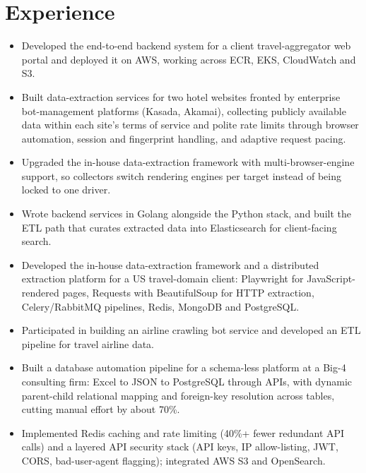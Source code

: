 \documentclass[10pt,a4paper]{article}
\begin{document}
\section{Experience}
\begin{itemize}
  \item Developed the end-to-end backend system for a client travel-aggregator web portal and deployed it on AWS, working across ECR, EKS, CloudWatch and S3.
  \item Built data-extraction services for two hotel websites fronted by enterprise bot-management platforms (Kasada, Akamai), collecting publicly available data within each site's terms of service and polite rate limits through browser automation, session and fingerprint handling, and adaptive request pacing.
  \item Upgraded the in-house data-extraction framework with multi-browser-engine support, so collectors switch rendering engines per target instead of being locked to one driver.
  \item Wrote backend services in Golang alongside the Python stack, and built the ETL path that curates extracted data into Elasticsearch for client-facing search.
\end{itemize}

\begin{itemize}
  \item Developed the in-house data-extraction framework and a distributed extraction platform for a US travel-domain client: Playwright for JavaScript-rendered pages, Requests with BeautifulSoup for HTTP extraction, Celery/RabbitMQ pipelines, Redis, MongoDB and PostgreSQL.
  \item Participated in building an airline crawling bot service and developed an ETL pipeline for travel airline data.
  \item Built a database automation pipeline for a schema-less platform at a Big-4 consulting firm: Excel to JSON to PostgreSQL through APIs, with dynamic parent-child relational mapping and foreign-key resolution across tables, cutting manual effort by about 70\%.
  \item Implemented Redis caching and rate limiting (40\%+ fewer redundant API calls) and a layered API security stack (API keys, IP allow-listing, JWT, CORS, bad-user-agent flagging); integrated AWS S3 and OpenSearch.
\end{itemize}
\end{document}
